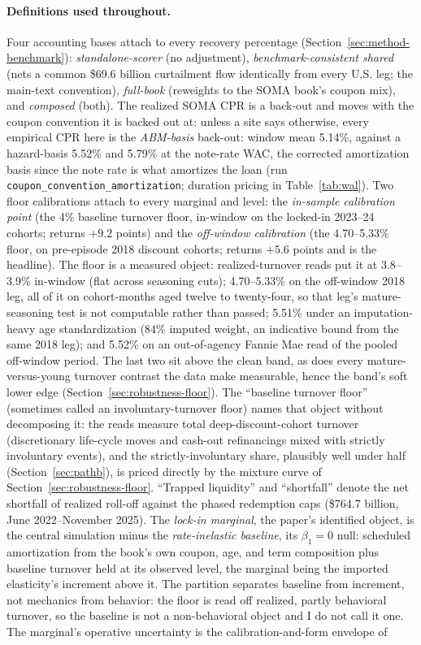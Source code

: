 \documentclass[12pt]{article}
\begin{document}
\paragraph{Definitions used throughout.} Four accounting bases attach to every recovery percentage (Section~\ref{sec:method-benchmark}): \emph{standalone-scorer} (no adjustment), \emph{benchmark-consistent shared} (nets a common \$69.6 billion curtailment flow identically from every U.S. leg; the main-text convention), \emph{full-book} (reweights to the SOMA book's coupon mix), and \emph{composed} (both). The realized SOMA CPR is a back-out and moves with the coupon convention it is backed out at: unless a site says otherwise, every empirical CPR here is the \emph{ABM-basis} back-out: window mean 5.14\%, against a hazard-basis 5.52\% and 5.79\% at the note-rate WAC, the corrected amortization basis since the note rate is what amortizes the loan (run \texttt{coupon\_convention\_amortization}; duration pricing in Table~\ref{tab:wal}). Two floor calibrations attach to every marginal and level: the \emph{in-sample calibration point} (the 4\% baseline turnover floor, in-window on the locked-in 2023--24 cohorts; returns $+9.2$ points) and the \emph{off-window calibration} (the 4.70--5.33\% floor, on pre-episode 2018 discount cohorts; returns $+5.6$ points and is the headline). The floor is a measured object: realized-turnover reads put it at 3.8--3.9\% in-window (flat across seasoning cuts); 4.70--5.33\% on the off-window 2018 leg, all of it on cohort-months aged twelve to twenty-four, so that leg's mature-seasoning test is not computable rather than passed; 5.51\% under an imputation-heavy age standardization (84\% imputed weight, an indicative bound from the same 2018 leg); and 5.52\% on an out-of-agency Fannie Mae read of the pooled off-window period. The last two sit above the clean band, as does every mature-versus-young turnover contrast the data make measurable, hence the band's soft lower edge (Section~\ref{sec:robustness-floor}). The ``baseline turnover floor'' (sometimes called an involuntary-turnover floor) names that object without decomposing it: the reads measure total deep-discount-cohort turnover (discretionary life-cycle moves and cash-out refinancings mixed with strictly involuntary events), and the strictly-involuntary share, plausibly well under half (Section~\ref{sec:pathb}), is priced directly by the mixture curve of Section~\ref{sec:robustness-floor}. ``Trapped liquidity'' and ``shortfall'' denote the net shortfall of realized roll-off against the phased redemption caps (\$764.7 billion, June 2022--November 2025). The \emph{lock-in marginal}, the paper's identified object, is the central simulation minus the \emph{rate-inelastic baseline}, its $\beta_1 = 0$ null: scheduled amortization from the book's own coupon, age, and term composition plus baseline turnover held at its observed level, the marginal being the imported elasticity's increment above it. The partition separates baseline from increment, not mechanics from behavior: the floor is read off realized, partly behavioral turnover, so the baseline is not a non-behavioral object and I do not call it one. The marginal's operative uncertainty is the calibration-and-form envelope of 
\end{document}
